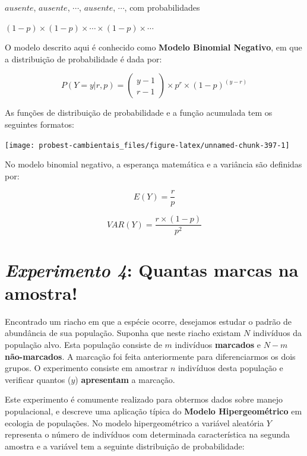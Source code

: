 \documentclass[
]{book}
\begin{document}
\(ausente\), \(ausente\), \(\cdots\), \(ausente\), \(\cdots\), com probabilidades

\((1-p) \times (1-p) \times \cdots \times (1-p) \times \cdots\)

O modelo descrito aqui é conhecido como \textbf{Modelo Binomial Negativo}, em que a distribuição de probabilidade é dada por:

\[P(Y = y|r,p) = \left (\begin{array}{c}
y - 1 \\
r - 1
\end{array}\right) \times p^{r} \times (1-p)^{(y-r)}\]

As funções de distribuição de probabilidade e a função acumulada tem os seguintes formatos:

\begin{center}\texttt{[image: probest-cambientais\_files/figure-latex/unnamed-chunk-397-1]} \end{center}

No modelo binomial negativo, a esperança matemática e a variância são definidas por:

\[E(Y) = \frac{r}{p}\]

\[VAR(Y) = \frac{r \times (1-p)}{p^2}\]

\hypertarget{experimento-4-quantas-marcas-na-amostra}{%
\section{\texorpdfstring{\emph{Experimento 4}: Quantas marcas na amostra!}{Experimento 4: Quantas marcas na amostra!}}\label{experimento-4-quantas-marcas-na-amostra}}

Encontrado um riacho em que a espécie ocorre, desejamos estudar o padrão de abundância de sua população. Suponha que neste riacho existam \(N\) indivíduos da população alvo. Esta população consiste de \(m\) indivíduos \textbf{marcados} e \(N-m\) \textbf{não-marcados}. A marcação foi feita anteriormente para diferenciarmos os dois grupos. O experimento consiste em amostrar \(n\) indivíduos desta população e verificar quantos (\(y\)) \textbf{apresentam} a marcação.

Este experimento é comumente realizado para obtermos dados sobre manejo populacional, e descreve uma aplicação típica do \textbf{Modelo Hipergeométrico} em ecologia de populações. No modelo hipergeométrico a variável aleatória \(Y\) representa o número de indivíduos com determinada característica na segunda amostra e a variável tem a seguinte distribuição de probabilidade:
\end{document}
